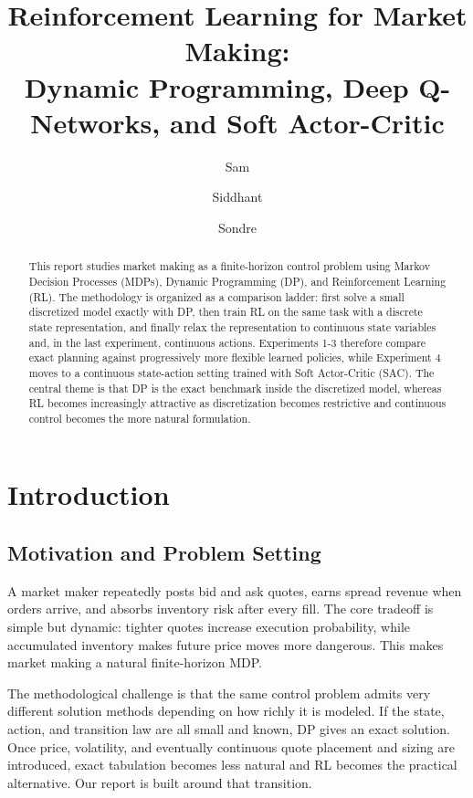 \documentclass[11pt,a4paper]{article}
\title{Reinforcement Learning for Market Making:\\
Dynamic Programming, Deep Q-Networks, and Soft Actor-Critic}
\author{Sam \and Siddhant \and Sondre}
\date{}
\begin{document}
\maketitle

\begin{abstract}
This report studies market making as a finite-horizon control problem using Markov Decision Processes (MDPs), Dynamic Programming (DP), and Reinforcement Learning (RL). The methodology is organized as a comparison ladder: first solve a small discretized model exactly with DP, then train RL on the same task with a discrete state representation, and finally relax the representation to continuous state variables and, in the last experiment, continuous actions. Experiments 1-3 therefore compare exact planning against progressively more flexible learned policies, while Experiment 4 moves to a continuous state-action setting trained with Soft Actor-Critic (SAC). The central theme is that DP is the exact benchmark inside the discretized model, whereas RL becomes increasingly attractive as discretization becomes restrictive and continuous control becomes the more natural formulation.
\end{abstract}

\section{Introduction}

\subsection{Motivation and Problem Setting}

A market maker repeatedly posts bid and ask quotes, earns spread revenue when orders arrive, and absorbs inventory risk after every fill. The core tradeoff is simple but dynamic: tighter quotes increase execution probability, while accumulated inventory makes future price moves more dangerous. This makes market making a natural finite-horizon MDP.

The methodological challenge is that the same control problem admits very different solution methods depending on how richly it is modeled. If the state, action, and transition law are all small and known, DP gives an exact solution. Once price, volatility, and eventually continuous quote placement and sizing are introduced, exact tabulation becomes less natural and RL becomes the practical alternative. Our report is built around that transition.
\end{document}

